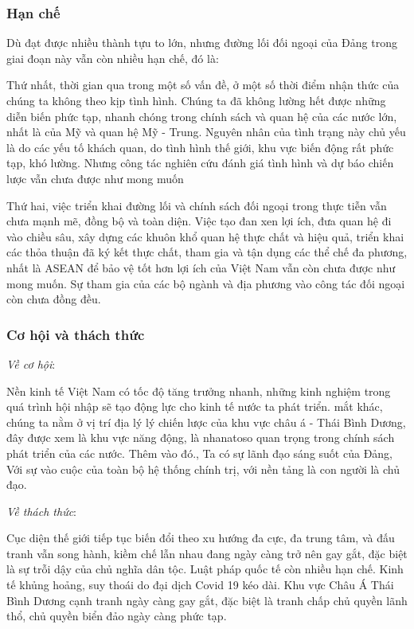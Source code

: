 \documentclass[12pt]{article}
\begin{document}
\subsubsection{Hạn chế}
Dù đạt được nhiều thành tựu to lớn, nhưng đường lối đối ngoại của Đảng trong giai
đoạn này vẫn còn nhiều hạn chế, đó là:

Thứ nhất, thời gian qua trong một số vấn đề, ở một số thời điểm nhận
thức của chúng ta không theo kịp tình hình. Chúng ta đã không lường hết được
những diễn biến phức tạp, nhanh chóng trong chính sách và quan hệ của các
nước lớn, nhất là của Mỹ và quan hệ Mỹ - Trung. Nguyên nhân của tình trạng
này chủ yếu là do các yếu tố khách quan, do tình hình thế giới, khu vực biến
động rất phức tạp, khó lường. Nhưng công tác nghiên cứu đánh giá
tình hình và dự báo chiến lược vẫn chưa được như mong muốn

Thứ hai, việc triển khai đường lối và chính sách đối ngoại trong thực tiễn
vẫn chưa mạnh mẽ, đồng bộ và toàn diện. Việc tạo đan xen
lợi ích, đưa quan hệ đi vào chiều sâu, xây dựng các khuôn khổ quan hệ thực chất
và hiệu quả, triển khai các thỏa thuận đã ký kết thực chất, tham gia và
tận dụng các thể chế đa phương, nhất là ASEAN để bảo vệ tốt hơn lợi ích của Việt
Nam vẫn còn chưa được như mong muốn. Sự tham gia của các bộ ngành và địa
phương vào công tác đối ngoại còn chưa đồng đều.

\subsubsection{Cơ hội và thách thức}
\textit{Về cơ hội}:

Nền kinh tế Việt Nam có tốc độ tăng trưởng nhanh, những
kinh nghiệm trong quá trình hội nhập sẽ tạo động lực cho kinh
tế nước ta phát triển. mắt khác, chúng ta nằm ở vị trí địa lý lý chiến lược của
khu vực châu á - Thái Bình Dương, đây được xem là khu vực năng động, là
nhanatoso quan trọng trong chính sách phát triển của các nước. Thêm vào đó., Ta
có sự lãnh đạo sáng suốt của Đảng, Với sự vào cuộc của toàn bộ
hệ thống chính trị, với nền tảng là con người là chủ đạo.

\textit{Về thách thức}:

Cục diện thế giới tiếp tục biến đổi theo xu hướng đa cực, đa
trung tâm, và đấu tranh vẫn song hành, kiềm chế lẫn nhau đang ngày càng trở nên
gay gắt, đặc biệt là sự trỗi dậy của chủ nghĩa dân tộc. Luật pháp quốc tế
còn nhiều hạn chế. Kinh tế khủng hoảng, suy thoái do đại dịch Covid
19 kéo dài. Khu vực Châu Á Thái Bình Dương cạnh tranh ngày càng gay gắt,
đặc biệt là tranh chấp chủ quyền lãnh thổ, chủ quyền biển đảo ngày càng phức
tạp.
\end{document}
